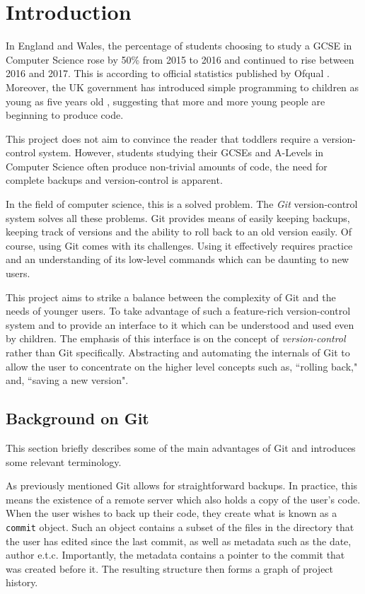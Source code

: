 \chapter{Introduction}

In England and Wales, the percentage of students choosing to study a GCSE in Computer Science rose by 50\% from 2015 to 2016 and continued to rise between 2016 and 2017. This is according to official statistics published by Ofqual  \cite{ofqual}. Moreover, the UK government has introduced simple programming to children as young as five years old \cite{primarycoding}, suggesting that more and more young people are beginning to produce code.

This project does not aim to convince the reader that toddlers require a version-control system. However, students studying their GCSEs and A-Levels in Computer Science often produce non-trivial amounts of code, the need for complete backups and version-control is apparent.

In the field of computer science, this is a solved problem. The \emph{Git} \cite{git} version-control system solves all these problems. Git provides means of easily keeping backups, keeping track of versions and the ability to roll back to an old version easily. Of course, using Git comes with its challenges. Using it effectively requires practice and an understanding of its low-level commands which can be daunting to new users.

This project aims to strike a balance between the complexity of Git and the needs of younger users. To take advantage of such a feature-rich version-control system and to provide an interface to it which can be understood and used even by children. The emphasis of this interface is on the concept of \emph{version-control} rather than Git specifically. Abstracting and automating the internals of Git to allow the user to concentrate on the higher level concepts such as, ``rolling back," and, ``saving a new version".

\section{Background on Git}

This section briefly describes some of the main advantages of Git and introduces some relevant terminology. 

As previously mentioned Git allows for straightforward backups. In practice, this means the existence of a remote server which also holds a copy of the user's code. When the user wishes to back up their code, they create what is known as a \texttt{commit} object. Such an object contains a subset of the files in the directory that the user has edited since the last commit, as well as metadata such as the date, author e.t.c. Importantly, the metadata contains a pointer to the commit that was created before it. The resulting structure then forms a graph of project history.


